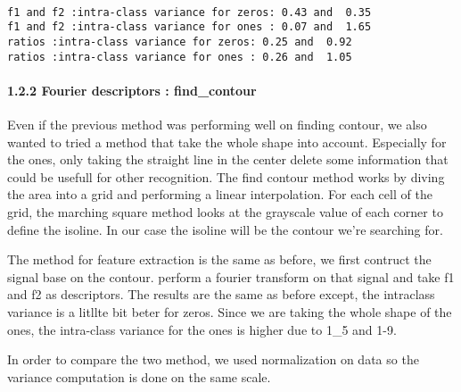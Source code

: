 \documentclass[11pt]{article}
\begin{document}
    \begin{center}
    \end{center}
    { \hspace*{\fill} \\}
    
    \begin{Verbatim}[commandchars=\\\{\}]
f1 and f2 :intra-class variance for zeros: 0.43 and  0.35
f1 and f2 :intra-class variance for ones : 0.07 and  1.65
ratios :intra-class variance for zeros: 0.25 and  0.92
ratios :intra-class variance for ones : 0.26 and  1.05

    \end{Verbatim}

    \paragraph{1.2.2 Fourier descriptors :
find\_contour}\label{fourier-descriptors-find_contour}

Even if the previous method was performing well on finding contour, we
also wanted to tried a method that take the whole shape into account.
Especially for the ones, only taking the straight line in the center
delete some information that could be usefull for other recognition. The
find contour method works by diving the area into a grid and performing
a linear interpolation. For each cell of the grid, the marching square
method looks at the grayscale value of each corner to define the
isoline. In our case the isoline will be the contour we're searching
for.

The method for feature extraction is the same as before, we first
contruct the signal base on the contour. perform a fourier transform on
that signal and take f1 and f2 as descriptors. The results are the same
as before except, the intraclass variance is a litllte bit beter for
zeros. Since we are taking the whole shape of the ones, the intra-class
variance for the ones is higher due to 1\_5 and 1-9.

In order to compare the two method, we used normalization on data so the
variance computation is done on the same scale.
\end{document}
